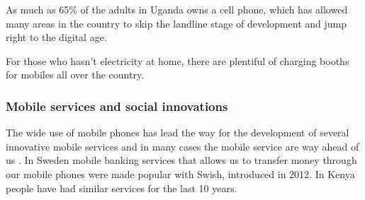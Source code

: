     As much as 65\% of the adults in Uganda owns a cell phone, which has allowed many areas in the country to skip the landline stage of development and jump right to the digital age.

    For those who hasn’t electricity at home, there are plentiful of charging booths for mobiles all over the country.

    \subsubsection{Mobile services and social innovations}
    The wide use of mobile phones has lead the way for the development of several innovative mobile services and in many cases the mobile service are way ahead of us  \citep{nissar}. In Sweden mobile banking services that allows us to transfer money through our mobile phones were made popular with Swish, introduced in 2012. In Kenya people have had similar services for the last 10 years.

